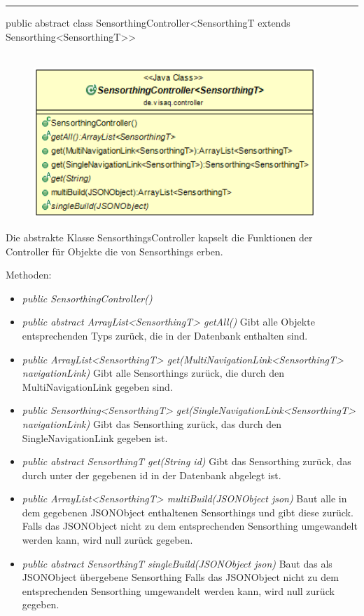 \rule{\textwidth}{0.4pt}
public abstract class SensorthingController<SensorthingT extends Sensorthing<SensorthingT>>
\\\\
\begin{minipage}{0.5\textwidth}
    \begin{figure}[H]
        {\centering\includegraphics[width=0.95\textwidth]{media/backend/controller/classes/SensorthingsController.png}}
    \end{figure}
    \end{minipage} \hfill
\begin{minipage}{0.5\textwidth}
    Die abstrakte Klasse SensorthingsController kapselt die Funktionen der Controller für Objekte die von Sensorthings erben.
\end{minipage}

Methoden:
\begin{itemize}
    \item \emph{public SensorthingController()}
    \item \emph{public abstract ArrayList<SensorthingT> getAll()}
    Gibt alle Objekte entsprechenden Typs zurück, die in der Datenbank enthalten sind.
    \item \emph{public ArrayList<SensorthingT> get(MultiNavigationLink<SensorthingT> navigationLink)}
    Gibt alle Sensorthings zurück, die durch den MultiNavigationLink gegeben sind.
    \item \emph{public Sensorthing<SensorthingT> get(SingleNavigationLink<SensorthingT> navigationLink)}
    Gibt das Sensorthing zurück, das durch den SingleNavigationLink gegeben ist.
    \item \emph{public abstract SensorthingT get(String id)}
    Gibt das Sensorthing zurück, das durch unter der gegebenen id in der Datenbank abgelegt ist.
    \item \emph{public ArrayList<SensorthingT> multiBuild(JSONObject json)}
    Baut alle in dem gegebenen JSONObject enthaltenen Sensorthings und gibt diese zurück.
    Falls das JSONObject nicht zu dem entsprechenden Sensorthing umgewandelt werden kann, wird null zurück gegeben.
    \item \emph{public abstract SensorthingT singleBuild(JSONObject json)}
    Baut das als JSONObject übergebene Sensorthing
    Falls das JSONObject nicht zu dem entsprechenden Sensorthing umgewandelt werden kann, wird null zurück gegeben.
\end{itemize}

